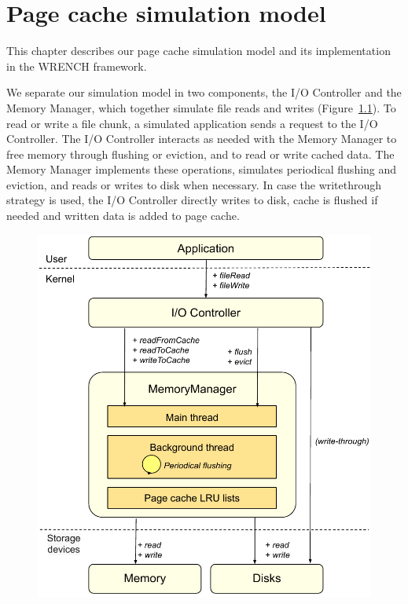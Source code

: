 \chapter{Page cache simulation model}
\label{method}

This chapter describes our page cache simulation model and its implementation 
in the WRENCH framework. 

We separate our simulation model in two components, the I/O
Controller and the Memory Manager, which together simulate
file reads and writes (Figure~\ref{fig:interaction}).
To read or write a file chunk, a simulated application sends a
request to the I/O Controller. The I/O Controller interacts as needed with
the Memory Manager to free memory through flushing or eviction,
and to read or write cached data. The Memory Manager
implements these operations, simulates periodical flushing
and eviction, and reads or writes to disk when necessary.
In case the writethrough strategy is used, the I/O Controller directly writes to disk, 
cache is flushed if needed and written data is added to page cache.

\begin{figure}
       \centering
       \includegraphics[width=0.7\columnwidth]{figures/interaction.pdf}
       \label{fig:interaction}
\end{figure}






